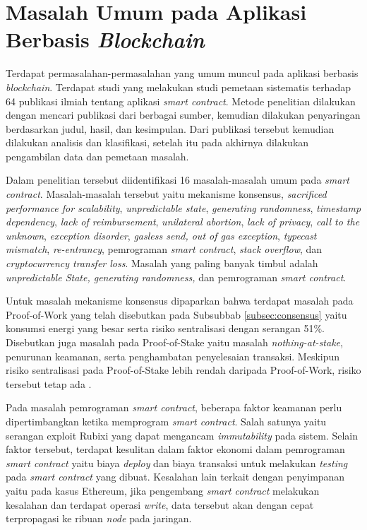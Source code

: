 \section{Masalah Umum pada Aplikasi Berbasis \textit{Blockchain}}
\label{sec:masalahblockchain}

Terdapat permasalahan-permasalahan yang umum muncul pada aplikasi berbasis \textit{blockchain}. Terdapat studi \citep{Macrinici2018} yang melakukan studi pemetaan sistematis terhadap 64 publikasi ilmiah tentang aplikasi \textit{smart contract}. Metode penelitian dilakukan dengan mencari publikasi dari berbagai sumber, kemudian dilakukan penyaringan berdasarkan judul, hasil, dan kesimpulan. Dari publikasi tersebut kemudian dilakukan analisis dan klasifikasi, setelah itu pada akhirnya dilakukan pengambilan data dan pemetaan masalah.

Dalam penelitian tersebut diidentifikasi 16 masalah-masalah umum pada \textit{smart contract}. Masalah-masalah tersebut yaitu mekanisme konsensus, \textit{sacrificed performance for scalability}, \textit{unpredictable state}, \textit{generating randomness}, \textit{timestamp dependency}, \textit{lack of reimbursement}, \textit{unilateral abortion}, \textit{lack of privacy}, \textit{call to the unknown}, \textit{exception disorder}, \textit{gasless send, out of gas exception}, \textit{typecast mismatch}, \textit{re-entrancy}, pemrograman \textit{smart contract}, \textit{stack overflow}, dan \textit{cryptocurrency transfer loss}. Masalah yang paling banyak timbul adalah \textit{unpredictable State, generating randomness,} dan pemrograman \textit{smart contract}. 

Untuk masalah mekanisme konsensus dipaparkan bahwa terdapat masalah pada Proof-of-Work yang telah disebutkan pada Subsubbab \ref{subsec:consensus} yaitu konsumsi energi yang besar serta risiko sentralisasi dengan serangan 51\%. Disebutkan juga masalah pada Proof-of-Stake yaitu masalah \textit{nothing-at-stake}, penurunan keamanan, serta penghambatan penyelesaian transaksi. Meskipun risiko sentralisasi pada Proof-of-Stake lebih rendah daripada Proof-of-Work, risiko tersebut tetap ada \citep{Macrinici2018}.

Pada masalah pemrograman \textit{smart contract}, beberapa faktor keamanan perlu dipertimbangkan ketika memprogram \textit{smart contract}. Salah satunya yaitu serangan exploit Rubixi yang dapat mengancam \textit{immutability} pada sistem. Selain faktor tersebut, terdapat kesulitan dalam faktor ekonomi dalam pemrograman \textit{smart contract} yaitu biaya \textit{deploy} dan biaya transaksi untuk melakukan \textit{testing} pada \textit{smart contract} yang dibuat. Kesalahan lain terkait dengan penyimpanan yaitu pada kasus Ethereum, jika pengembang \textit{smart contract} melakukan kesalahan dan terdapat operasi \textit{write}, data tersebut akan dengan cepat terpropagasi ke ribuan \textit{node} pada jaringan.

